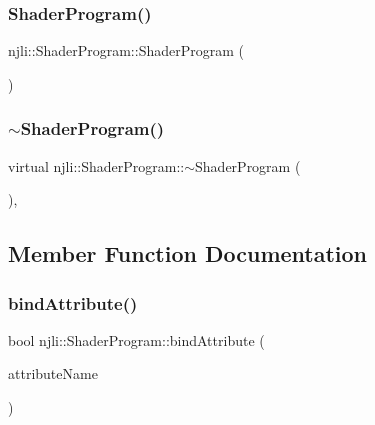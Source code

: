 \subsubsection{\texorpdfstring{Shader\+Program()}{ShaderProgram()}\hspace{0.1cm}{\footnotesize\ttfamily [3/3]}}
{\footnotesize\ttfamily njli\+::\+Shader\+Program\+::\+Shader\+Program (\begin{DoxyParamCaption}\item[{const \mbox{\hyperlink{classnjli_1_1_shader_program}{Shader\+Program}} \&}]{ }\end{DoxyParamCaption})\hspace{0.3cm}{\ttfamily [protected]}}

\mbox{\label{classnjli_1_1_shader_program_a8b08a64a5724aba5cc614c2288846044}} 
\subsubsection{\texorpdfstring{$\sim$\+Shader\+Program()}{~ShaderProgram()}}
{\footnotesize\ttfamily virtual njli\+::\+Shader\+Program\+::$\sim$\+Shader\+Program (\begin{DoxyParamCaption}{ }\end{DoxyParamCaption})\hspace{0.3cm}{\ttfamily [protected]}, {\ttfamily [virtual]}}



\subsection{Member Function Documentation}
\mbox{\label{classnjli_1_1_shader_program_a0f30cbd74175ed6967bafc46b35bb928}} 
\subsubsection{\texorpdfstring{bind\+Attribute()}{bindAttribute()}}
{\footnotesize\ttfamily bool njli\+::\+Shader\+Program\+::bind\+Attribute (\begin{DoxyParamCaption}\item[{const char $\ast$}]{attribute\+Name }\end{DoxyParamCaption})\hspace{0.3cm}{\ttfamily [protected]}}

